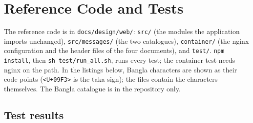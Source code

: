 \documentclass[11pt,a4paper]{article}
\begin{document}
\section{Reference Code and Tests}
\label{app:code}
The reference code is in \texttt{docs/design/web/}: \texttt{src/} (the modules the application imports unchanged), \texttt{src/messages/} (the two catalogues), \texttt{container/} (the nginx configuration and the header files of the four documents), and \texttt{test/}. \texttt{npm install}, then \texttt{sh test/run\_all.sh}, runs every test; the container test needs nginx on the path. In the listings below, Bangla characters are shown as their code points (\texttt{<U+09F3>} is the taka sign); the files contain the characters themselves. The Bangla catalogue is in the repository only.

\subsection{Test results}
\label{app:tests}
\end{document}
